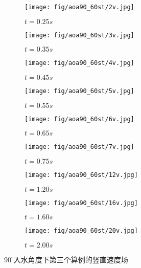 \begin{figure}[!htp]
  \centering

  \begin{subfigure}{0.25\textwidth}
    \centering
    \texttt{[image: fig/aoa90\_60st/2v.jpg]}
    \caption{$t = 0.25s$}
  \end{subfigure}
  \hspace{1cm}
  \begin{subfigure}{0.25\textwidth}
    \centering
    \texttt{[image: fig/aoa90\_60st/3v.jpg]}
    \caption{$t = 0.35s$}
  \end{subfigure}
  \hspace{1cm}
  \begin{subfigure}{0.25\textwidth}
    \centering
    \texttt{[image: fig/aoa90\_60st/4v.jpg]}
    \caption{$t = 0.45s$}
  \end{subfigure}

  \quad

  \begin{subfigure}{0.25\textwidth}
    \centering
    \texttt{[image: fig/aoa90\_60st/5v.jpg]}
    \caption{$t = 0.55s$}
  \end{subfigure}
  \hspace{1cm}
  \begin{subfigure}{0.25\textwidth}
    \centering
    \texttt{[image: fig/aoa90\_60st/6v.jpg]}
    \caption{$t = 0.65s$}
  \end{subfigure}
  \hspace{1cm}
  \begin{subfigure}{0.25\textwidth}
    \centering
    \texttt{[image: fig/aoa90\_60st/7v.jpg]}
    \caption{$t = 0.75s$}
  \end{subfigure}

  \quad

  \begin{subfigure}{0.25\textwidth}
    \centering
    \texttt{[image: fig/aoa90\_60st/12v.jpg]}
    \caption{$t = 1.20s$}
  \end{subfigure}
  \hspace{1cm}
  \begin{subfigure}{0.25\textwidth}
    \centering
    \texttt{[image: fig/aoa90\_60st/16v.jpg]}
    \caption{$t = 1.60s$}
  \end{subfigure}
  \hspace{1cm}
  \begin{subfigure}{0.25\textwidth}
    \centering
    \texttt{[image: fig/aoa90\_60st/20v.jpg]}
    \caption{$t = 2.00s$}
  \end{subfigure}

  \caption{$90^\circ$入水角度下第三个算例的竖直速度场}
  \label{fig:detail_90_v}
\end{figure}

